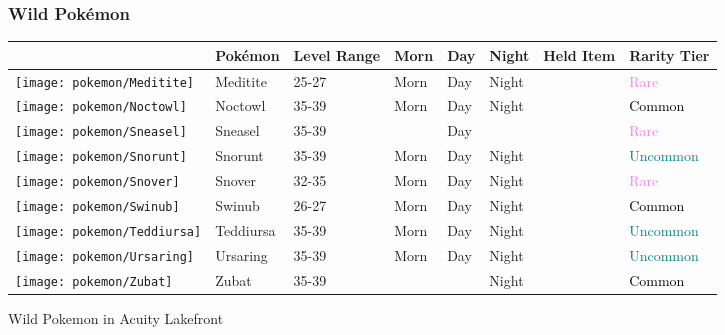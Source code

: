 \subsubsection{Wild Pokémon}%
\label{ssubsec:WildPokmon}%
\begin{longtable}{||l l l l l l l l||}%
\hline%
&Pokémon&Level Range&Morn&Day&Night&Held Item&Rarity Tier\\%
\hline%
\endhead%
\hline%
\texttt{[image: pokemon/Meditite]}&Meditite&25{-}27&Morn&Day&Night&&\textcolor{violet}{%
Rare%
}\\%
\hline%
\texttt{[image: pokemon/Noctowl]}&Noctowl&35{-}39&Morn&Day&Night&&\textcolor{black}{%
Common%
}\\%
\hline%
\texttt{[image: pokemon/Sneasel]}&Sneasel&35{-}39&&Day&&&\textcolor{violet}{%
Rare%
}\\%
\hline%
\texttt{[image: pokemon/Snorunt]}&Snorunt&35{-}39&Morn&Day&Night&&\textcolor{teal}{%
Uncommon%
}\\%
\hline%
\texttt{[image: pokemon/Snover]}&Snover&32{-}35&Morn&Day&Night&&\textcolor{violet}{%
Rare%
}\\%
\hline%
\texttt{[image: pokemon/Swinub]}&Swinub&26{-}27&Morn&Day&Night&&\textcolor{black}{%
Common%
}\\%
\hline%
\texttt{[image: pokemon/Teddiursa]}&Teddiursa&35{-}39&Morn&Day&Night&&\textcolor{teal}{%
Uncommon%
}\\%
\hline%
\texttt{[image: pokemon/Ursaring]}&Ursaring&35{-}39&Morn&Day&Night&&\textcolor{teal}{%
Uncommon%
}\\%
\hline%
\texttt{[image: pokemon/Zubat]}&Zubat&35{-}39&&&Night&&\textcolor{black}{%
Common%
}\\%
\hline%
\end{longtable}%
\caption{Wild Pokemon in Acuity Lakefront}